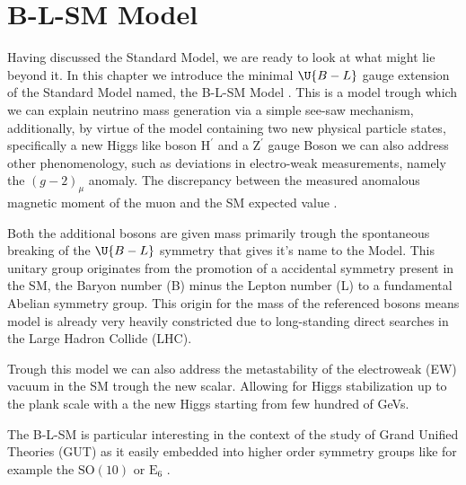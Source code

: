 \newpage 

% 
% 
% 

\chapter{B-L-SM Model} 


{\color{gray} Having discussed the Standard Model, we are ready to look at what might lie beyond it.} In this chapter we introduce the minimal $\U{B-L}$ gauge extension of the Standard Model named, the B-L-SM Model \cite{Mohapatra:1980qe,Basso:2010hk,Basso:2011na}. This is a model trough which we can explain neutrino mass generation via a simple see-saw mechanism, additionally, by virtue of the model containing two new physical particle states, specifically a new Higgs like boson $\mathrm{H}^\prime$ and a $\mathrm{Z}^\prime$ gauge Boson we can also address other phenomenology, such as deviations in electro-weak measurements, namely the $(g-2)_\mu$ anomaly. The discrepancy between the measured anomalous magnetic moment of the muon and the SM expected value \cite{Tanabashi:2018oca}. 

Both the additional bosons are given mass primarily trough the spontaneous breaking of the $\U{B-L}$ symmetry {\color{gray}that gives it's name to the Model.} This unitary group originates from the promotion of a accidental symmetry present in the SM, the Baryon number (B) minus the Lepton number (L) to a fundamental Abelian symmetry group. This origin for the mass of the referenced bosons means model is already very heavily constricted due to long-standing direct searches in the Large Hadron Collide (LHC). 

Trough this model we can also address the metastability of the electroweak {\color{gray}(EW)} vacuum in the SM trough the new scalar. Allowing for Higgs stabilization up to the plank scale with a the new Higgs starting from few hundred of GeVs. 

The B-L-SM is particular interesting in the context of the study of Grand Unified Theories (GUT) as it easily embedded into higher order symmetry groups like for example the $\mathrm{SO(10)}$ \cite{Chanowitz:1977ye,Fritzsch:1974nn,Georgi:1978fu,Georgi:1979dq,Georgi:1979ga} or $\mathrm{E}_6$ \cite{Achiman:1978vg,Gursey:1975ki,Gursey:1981kf}.   

